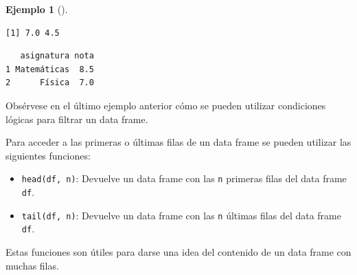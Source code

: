 \documentclass[
  spanish,
  a4paper,
]{scrreport}
\newenvironment{Shaded}{\begin{snugshade}}{\end{snugshade}}
\newcommand{\DecValTok}[1]{\textcolor[rgb]{0.68,0.00,0.00}{#1}}
\newcommand{\NormalTok}[1]{\textcolor[rgb]{0.00,0.23,0.31}{#1}}
\newcommand{\SpecialCharTok}[1]{\textcolor[rgb]{0.37,0.37,0.37}{#1}}
\theoremstyle{definition}
\theoremstyle{definition}
\newtheorem{example}{Ejemplo}[chapter]
\theoremstyle{remark}
\begin{document}
\begin{example}[]
\begin{verbatim}
[1] 7.0 4.5
\end{verbatim}

\begin{Shaded}
\end{Shaded}

\begin{verbatim}
   asignatura nota
1 Matemáticas  8.5
2      Física  7.0
\end{verbatim}

\end{example}

Obsérvese en el último ejemplo anterior cómo se pueden utilizar
condiciones lógicas para filtrar un data frame.

Para acceder a las primeras o últimas filas de un data frame se pueden
utilizar las siguientes funciones:

\begin{itemize}
\item
  \texttt{head(df,\ n)}: Devuelve un data frame con las \texttt{n}
  primeras filas del data frame \texttt{df}.
\item
  \texttt{tail(df,\ n)}: Devuelve un data frame con las \texttt{n}
  últimas filas del data frame \texttt{df}.
\end{itemize}

Estas funciones son útiles para darse una idea del contenido de un data
frame con muchas filas.
\end{document}
